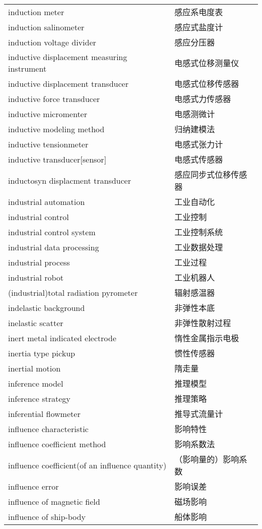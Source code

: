\documentclass[
]{article}
\begin{document}
\begin{longtable}[]{@{}ll@{}}
induction meter & 感应系电度表 \\
induction salinometer & 感应式盐度计 \\
induction voltage divider & 感应分压器 \\
inductive displacement measuring instrument & 电感式位移测量仪 \\
inductive displacement transducer & 电感式位移传感器 \\
inductive force transducer & 电感式力传感器 \\
inductive micromenter & 电感测微计 \\
inductive modeling method & 归纳建模法 \\
inductive tensionmeter & 电感式张力计 \\
inductive transducer{[}sensor{]} & 电感式传感器 \\
inductosyn displacment transducer & 感应同步式位移传感器 \\
industrial automation & 工业自动化 \\
industrial control & 工业控制 \\
industrial control system & 工业控制系统 \\
industrial data processing & 工业数据处理 \\
industrial process & 工业过程 \\
industrial robot & 工业机器人 \\
(industrial)total radiation pyrometer & 辐射感温器 \\
indelastic background & 非弹性本底 \\
inelastic scatter & 非弹性散射过程 \\
inert metal indicated electrode & 惰性金属指示电极 \\
inertia type pickup & 惯性传感器 \\
inertial motion & 隋走量 \\
inference model & 推理模型 \\
inference strategy & 推理策略 \\
inferential flowmeter & 推导式流量计 \\
influence characteristic & 影响特性 \\
influence coefficient method & 影响系数法 \\
influence coefficient(of an influence quantity) &
（影响量的）影响系数 \\
influence error & 影响误差 \\
influence of magnetic field & 磁场影响 \\
influence of ship-body & 船体影响 \\

\end{longtable}
\end{document}
